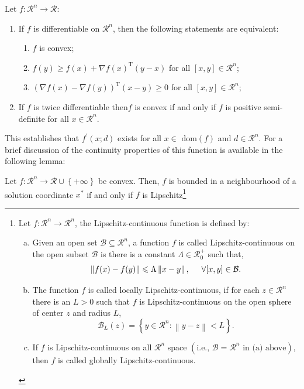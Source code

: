 \begin{itemize}
\begin{thm}\label{Theorem_Convex3}
   Let $f:\mathcal{R}^{n}\rightarrow\mathcal{R}$:
     \begin{enumerate}
        \item If $f$ is differentiable on $\mathcal{R}^{n}$, then the following statements are equivalent:
             \begin{enumerate}
                 \item $f$ is convex;
                 \item $f(y)\ge f(x)+\nabla f(x)^{\text{T}}\left(y-x\right)$ for all $[x,y]\in\mathcal{R}^{n}$;
                 \item $\left(\nabla f(x)-\nabla f(y)\right)^{\text{T}}(x-y) \ge 0$ for all $[x,y]\in\mathcal{R}^{n}$;
             \end{enumerate}
        \item If $f$ is twice differentiable then$f$ is convex if and only if $f$ is positive semi-definite for all $x\in\mathcal{R}^{n}$.
     \end{enumerate}
\end{thm}

This establishes that $f^{\prime}\left(x;d\right)$ exists for all $x\in\text{ dom}(f)$ and $d\in\mathcal{R}^{n}$. For a brief discussion of the continuity properties of this function is available in the following lemma:
\begin{lem}
    Let $f:\mathcal{R}^{n}\rightarrow\mathcal{R}\cup\left\{+\infty\right\}$ be convex. Then, $f$ is bounded in a neighbourhood of a solution coordinate $x^{\ast}$ if and only if $f$ is Lipschitz\footnote{
Let $f:\mathcal{R}^{n}\rightarrow\mathcal{R}^{n}$, the Lipschitz-continuous function is defined by:
    \begin{enumerate}[(a)]
       \item Given an open set $\mathcal{B}\subseteq\mathcal{R}^{n}$, a function $f$ is called Lipschitz-continuous on the open subset $\mathcal{B}$ is there is a constant $\Lambda\in\mathcal{R}_{0}^{+}$ such that,
           \begin{displaymath}
               \left\|f(x)-f(y)\right\| \le  \Lambda\left\|x-y\right\|, \hspace{.5cm} \forall[x,y]\in\mathcal{B}.
           \end{displaymath}
       \item The function $f$ is called locally Lipschitz-continuous, if for each $z\in\mathcal{R}^{n}$ there is an $L>0$ such that $f$ is Lipschitz-continuous on the open sphere of center $z$ and radius $L$,
           \begin{displaymath}
              \mathcal{B}_{L}(z) = \left\{y\in\mathcal{R}^{n} :\left\|y-z\right\| < L\right\}.
           \end{displaymath}
       \item If $f$ is Lipschitz-continuous on all $\mathcal{R}^{n}$ space $\left(\text{i.e., }\mathcal{B}=\mathcal{R}^{n}\text{ in (a) above}\right)$, then $f$ is called globally Lipschitz-continuous.


\end{enumerate}}
\end{lem}
\end{itemize}
